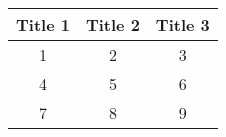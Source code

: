 \begin{tabular}{|c|c|c|}
\hline
Title 1 & Title 2 & Title 3 \\ \hline
1 & 2 & 3 \\ \hline
4 & 5 & 6 \\ \hline
7 & 8 & 9 \\ \hline
\end{tabular}
